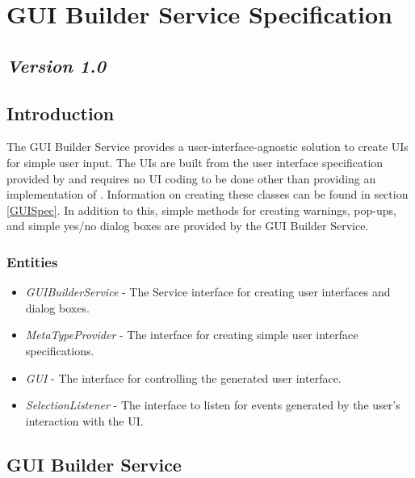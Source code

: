 \chapter{GUI Builder Service Specification}
\section*{\textit{Version 1.0}}
\section{Introduction}

The GUI Builder Service provides a user-interface-agnostic solution to
create UIs for simple user input. The UIs are built from the user interface
specification provided by  and requires no UI coding to
be done other than providing an implementation of .
Information on creating these classes can be found in section \ref{GUISpec}. In
addition to this, simple methods for creating warnings, pop-ups, and
simple yes/no dialog boxes are provided by the GUI Builder Service.

\subsection{Entities}

\begin{itemize}
  \item \textit{GUIBuilderService} - The Service interface for creating
  user interfaces and dialog boxes.
  \item \textit{MetaTypeProvider} - The interface for creating simple user
  interface specifications.
  \item \textit{GUI} - The interface for controlling the
   generated user interface.
  \item \textit{SelectionListener} - The interface to listen for events
  generated by the user's interaction with the UI.
\end{itemize}

\section{GUI Builder Service}


\orgcishellserviceguibuilder{}

